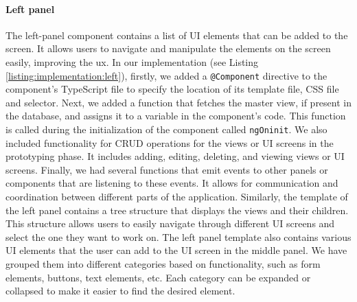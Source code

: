 \paragraph{Left panel}
The left-panel component contains a list of UI elements that can be added to the screen.
It allows users to navigate and manipulate the elements on the screen easily, improving the \ac{ux}.
In our implementation (see Listing \ref{listing:implementation:left}), firstly, we added a \texttt{@Component} directive to the component's TypeScript file to specify the location of its template file, CSS file and selector.
Next, we added a function that fetches the master view, if present in the database, and assigns it to a variable in the component's code. 
This function is called during the initialization of the component called \texttt{ngOninit}. 
We also included functionality for CRUD operations for the views or UI screens in the prototyping phase. 
It includes adding, editing, deleting, and viewing views or UI screens. 
Finally, we had several functions that emit events to other panels or components that are listening to these events. 
It allows for communication and coordination between different parts of the application.
Similarly, the template of the left panel contains a tree structure that displays the views and their children. 
This structure allows users to easily navigate through different UI screens and select the one they want to work on. 
The left panel template also contains various UI elements that the user can add to the UI screen in the middle panel.
We have grouped them into different categories based on functionality, such as form elements, buttons, text elements, etc. 
Each category can be expanded or collapsed to make it easier to find the desired element.

